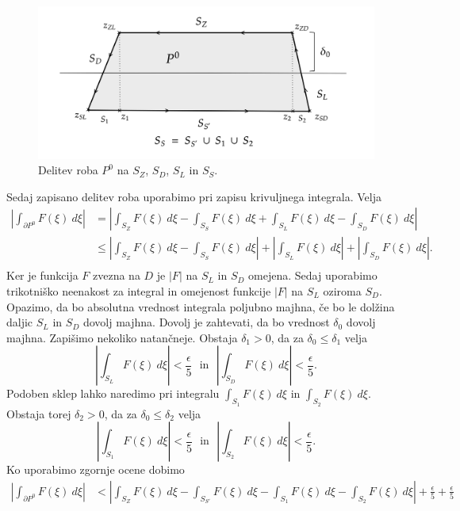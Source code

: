 \documentclass[mat1, tisk]{fmfdelo}
\begin{document}
\begin{dokaz}
\begin{figure}[H]
\begin{center}
                \includegraphics[width = \textwidth]{schwarz_hol_int.png}
                \caption{Delitev roba $P^0$ na $S_Z$, $S_D$, $S_L$ in $S_S$.}
            \end{center}    
        \end{figure}
        Sedaj zapisano delitev roba uporabimo pri zapisu krivuljnega integrala. Velja
        \begin{align*}
            \left|\int_{\partial P^0}{F(\xi)~d\xi}\right| &= \left|\int_{S_Z}{F(\xi)~d\xi} - \int_{S_S}{F(\xi)~d\xi} + \int_{S_L}{F(\xi)~d\xi} - \int_{S_D}{F(\xi)~d\xi}\right|\\
            & \leq \left|\int_{S_Z}{F(\xi)~d\xi} - \int_{S_S}{F(\xi)~d\xi} \right| + \left|\int_{S_L}{F(\xi)~d\xi}\right| + \left|\int_{S_D}{F(\xi)~d\xi}\right|.\\
        \end{align*}
        Ker je funkcija $F$ zvezna na $D$ je $|F|$ na $S_L$ in $S_D$ omejena. 
        Sedaj uporabimo trikotniško neenakost za integral in omejenost funkcije $|F|$ na $S_L$ oziroma $S_D$. 
        Opazimo, da bo absolutna vrednost integrala poljubno majhna, če bo le dolžina daljic $S_L$ in $S_D$ dovolj majhna. 
        Dovolj je zahtevati, da bo vrednost $\delta_0$ dovolj majhna. 
        Zapišimo nekoliko natančneje. Obstaja $\delta_1 > 0$, da za $\delta_0 \leq \delta_1$ velja
        $$ 
        \left|\int_{S_L}{F(\xi)~d\xi}\right| < \frac{\epsilon}{5}~~~\text{in}~~~\left|\int_{S_D}{F(\xi)~d\xi}\right| < \frac{\epsilon}{5}.
        $$
        Podoben sklep lahko naredimo pri integralu $\int_{S_1}{F(\xi)~d\xi}$ in $\int_{S_2}{F(\xi)~d\xi}$. Obstaja torej $\delta_2 > 0$, da za $\delta_0 \leq \delta_2$ velja
        $$ 
        \left|\int_{S_1}{F(\xi)~d\xi}\right| < \frac{\epsilon}{5}~~~\text{in}~~~\left|\int_{S_2}{F(\xi)~d\xi}\right| < \frac{\epsilon}{5}.
        $$
        Ko uporabimo zgornje ocene dobimo
        \begin{align*}
            \left|\int_{\partial P^0}{F(\xi)~d\xi}\right|&< \left|\int_{S_Z}{F(\xi)~d\xi} - \int_{S_{S'}}{F(\xi)~d\xi} - \int_{S_1}{F(\xi)~d\xi} - \int_{S_2}{F(\xi)~d\xi}\right| + \frac{\epsilon}{5} +  \frac{\epsilon}{5}\\

\end{align*}
\end{dokaz}
\end{document}
